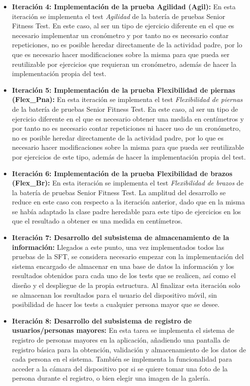 \begin{itemize}
\item \textbf{Iteración 4: Implementación de la prueba Agilidad (Agil):} En esta iteración se implementa el test \textit{Agilidad} de la batería de pruebas Senior Fitness Test. En este caso, al ser un tipo de ejercicio diferente en el que es necesario implementar un cronómetro y por tanto no es necesario contar repeticiones, no es posible heredar directamente de la actividad padre, por lo que es necesario hacer modificaciones sobre la misma para que pueda ser reutilizable por ejercicios que requieran un cronómetro, además de hacer la implementación propia del test.
\item \textbf{Iteración 5: Implementación de la prueba Flexibilidad de piernas (Flex\_Pna):} En esta iteración se implementa el test \textit{Flexibilidad de piernas} de la batería de pruebas Senior Fitness Test. En este caso, al ser un tipo de ejercicio diferente en el que es necesario obtener una medida en centímetros y por tanto no es necesario contar repeticiones ni hacer uso de un cronómetro, no es posible heredar directamente de la actividad padre, por lo que es necesario hacer modificaciones sobre la misma para que pueda ser reutilizable por ejercicios de este tipo, además de hacer la implementación propia del test.
\item \textbf{Iteración 6: Implementación de la prueba Flexibilidad de brazos (Flex\_Br):} En esta iteración se implementa el test \textit{Flexibilidad de brazos} de la batería de pruebas Senior Fitness Test. La amplitud del desarrollo se reduce en este caso con respecto a la iteración anterior, dado que en la misma se había adaptado la clase padre heredable para este tipo de ejercicios en los que el resultado a obtener es una medida en centímetros.
\item \textbf{Iteración 7: Desarrollo del subsistema de almacenamiento de la información:} Llegados a este punto, una vez implementados todos las pruebas de la SFT, se considera necesario empezar con la implementación del sistema encargado de almacenar en una base de datos la información y los resultados obtenidos para cada uno de los tests que se realicen, así como el diseño y el despliegue de la propia estructura. Al finalizar esta iteración solo se almacenan los resultados para el usuario del dispositivo móvil, sin posibilidad de hacer los tests a cualquier persona mayor que se desee.
\item \textbf{Iteración 8: Desarrollo del subsistema de registro de usuarios/personas mayores:} En esta tarea se implementa el sistema de registro de personas mayores en la aplicación, añadiendo una pantalla de registro básica para la obtención, validación y almacenamiento de los datos de cada persona en el sistema. También se implementa la funcionalidad para acceder a la cámara del dispositivo por si se quiere tomar una foto de la persona durante el registro, o bien elegir una imagen de la galería.

\end{itemize}
